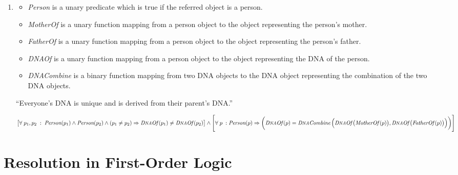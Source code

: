 \begin{enumerate}
\item
\begin{itemize}
\item \textit{Person} is a unary predicate which is true if the referred object is a person.
\item \textit{MotherOf} is a unary function mapping from a person object to the object representing the person's mother.
\item \textit{FatherOf} is a unary function mapping from a person object to the object representing the person's father.
\item \textit{D{\footnotesize NA}Of\thinspace} is a unary function mapping from a person object to the object representing the DNA of the person.
\item \textit{D{\footnotesize NA}Combine\thinspace} is a binary function mapping from two DNA objects to the DNA object representing the combination of the two DNA objects.
\end{itemize}

``Everyone's DNA is unique and is derived from their parent's DNA.''

$\big[\forall \; p_1, p_2 \; : \; \textit{Person}(p_1) \land \textit{Person}(p_2) \land (p_1 \neq p_2) \Rightarrow \textit{D{\footnotesize NA}Of\thinspace}(p_1) \neq \textit{D{\footnotesize NA}Of\thinspace}(p_2) \big] \land \\
\Bigg[ \forall \; p \; : \textit{Person}(p) \Rightarrow \bigg(\textit{D{\footnotesize NA}Of\thinspace}(p) = \textit{D{\footnotesize NA}Combine\thinspace}\Big(\textit{D{\footnotesize NA}Of\thinspace}\big(\textit{MotherOf\thinspace}(p)\big), \textit{D{\footnotesize NA}Of\thinspace}\big(\textit{FatherOf\thinspace}(p)\big)\Big)\bigg) \Bigg]$

\end{enumerate}

\section{Resolution in First-Order Logic}

